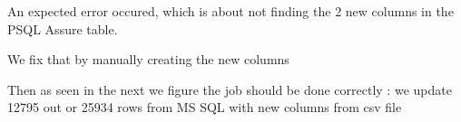 An expected error occured, which is about not finding the 2 new columns in the PSQL Assure table.
\begin{figure}[H]
\centering
{}
\end{figure}
\vskip0.2cm
\begin{figure}[H]
\centering
{}
\end{figure}
\vskip0.2cm

We fix that by manually creating the new columns
\begin{figure}[H]
\centering
{}
\end{figure}
\vskip0.2cm

Then as seen in the next we figure the job should be done correctly : we update 12795 out or 25934 rows from MS SQL with new columns from csv file 
\begin{figure}[H]
\centering
{}
\end{figure}
\vskip0.2cm

